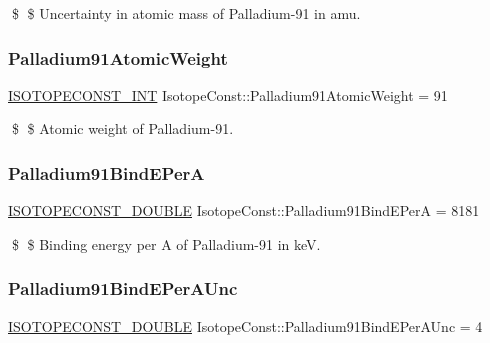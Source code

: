 \$ \$ Uncertainty in atomic mass of Palladium-\/91 in amu. \mbox{\label{group___isotope_const-_palladium-_pd91_ga9bc33ea162d3b106e26bd009da109fb1}} 
\subsubsection{\texorpdfstring{Palladium91\+Atomic\+Weight}{Palladium91AtomicWeight}}
{\footnotesize\ttfamily \mbox{\hyperlink{group___isotope_const-_macros_ga5f18360b3e99483a35c32d789e62621c}{I\+S\+O\+T\+O\+P\+E\+C\+O\+N\+S\+T\+\_\+\+I\+NT}} Isotope\+Const\+::\+Palladium91\+Atomic\+Weight = 91}

\$ \$ Atomic weight of Palladium-\/91. \mbox{\label{group___isotope_const-_palladium-_pd91_ga3cfc443dbf2258c659e5e32c4e88d64b}} 
\subsubsection{\texorpdfstring{Palladium91\+Bind\+E\+PerA}{Palladium91BindEPerA}}
{\footnotesize\ttfamily \mbox{\hyperlink{group___isotope_const-_macros_ga8f45a7272ce02c0b4c65c44636ed719a}{I\+S\+O\+T\+O\+P\+E\+C\+O\+N\+S\+T\+\_\+\+D\+O\+U\+B\+LE}} Isotope\+Const\+::\+Palladium91\+Bind\+E\+PerA = 8181}

\$ \$ Binding energy per A of Palladium-\/91 in keV. \mbox{\label{group___isotope_const-_palladium-_pd91_gaa3736ac5212a66055fd65f782302e56a}} 
\subsubsection{\texorpdfstring{Palladium91\+Bind\+E\+Per\+A\+Unc}{Palladium91BindEPerAUnc}}
{\footnotesize\ttfamily \mbox{\hyperlink{group___isotope_const-_macros_ga8f45a7272ce02c0b4c65c44636ed719a}{I\+S\+O\+T\+O\+P\+E\+C\+O\+N\+S\+T\+\_\+\+D\+O\+U\+B\+LE}} Isotope\+Const\+::\+Palladium91\+Bind\+E\+Per\+A\+Unc = 4}

